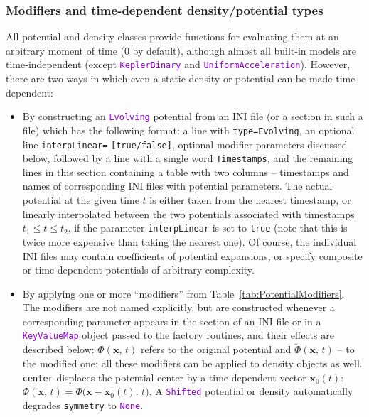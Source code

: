 \documentclass[12pt]{article}
\newcommand{\ttt}[1]{\textcolor{darkviolet}{\texttt{#1}}}
\newcommand{\ppp}[1]{\textcolor{darkolive} {\texttt{#1}}}
\begin{document}
\subsubsection{Modifiers and time-dependent density/potential types}  \label{sec:PotentialModifiers}

All potential and density classes provide functions for evaluating them at an arbitrary moment of time (0 by default), although almost all built-in models are time-independent (except \ttt{KeplerBinary} and \ttt{UniformAcceleration}). However, there are two ways in which even a static density or potential can be made time-dependent:

\begin{itemize}
\item By constructing an \ttt{Evolving} potential from an INI file (or a section in such a file) which has the following format: a line with \ppp{type=Evolving}, an optional line \ppp{interpLinear=} \ppp{[true/false]}, optional modifier parameters discussed below, followed by a line with a single word \texttt{Timestamps}, and the remaining lines in this section containing a table with two columns -- timestamps and names of corresponding INI files with potential parameters. The actual potential at the given time $t$ is either taken from the nearest timestamp, or linearly interpolated between the two potentials associated with timestamps $t_1 \le t \le t_2$, if the parameter \ppp{interpLinear} is set to \texttt{true} (note that this is twice more expensive than taking the nearest one). Of course, the individual INI files may contain coefficients of potential expansions, or specify composite or time-dependent potentials of arbitrary complexity.
%
\item By applying one or more ``modifiers'' from Table~\ref{tab:PotentialModifiers}. The modifiers are not named explicitly, but are constructed whenever a corresponding parameter appears in the section of an INI file or in a \ttt{KeyValueMap} object passed to the factory routines, and their effects are described below: $\Phi(\boldsymbol x,\,t)$ refers to the original potential and $\widetilde\Phi(\boldsymbol x,\,t)$ -- to the modified one; all these modifiers can be applied to density objects as well.\\
%
\ppp{center} displaces the potential center by a time-dependent vector $\boldsymbol x_0(t)$: $\widetilde\Phi(\boldsymbol x,\,t) = \Phi\big( \boldsymbol x - \boldsymbol x_0(t),\,t\big)$. A \ttt{Shifted} potential or density automatically degrades \ppp{symmetry} to \ttt{None}.\\

\end{itemize}
\end{document}
